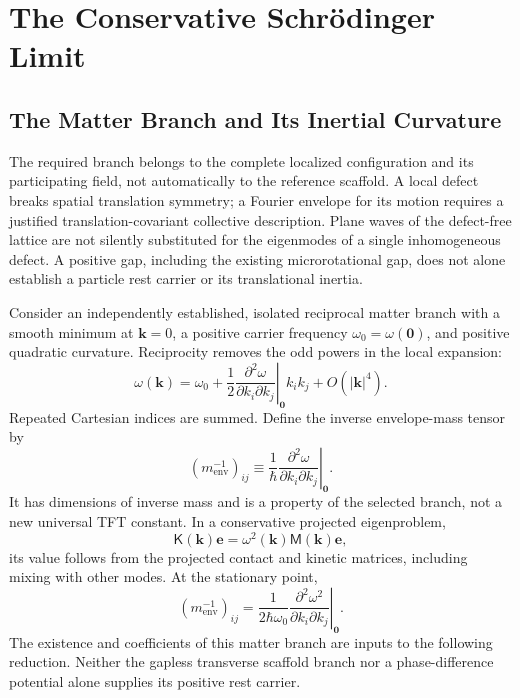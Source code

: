 \section{The Conservative Schr\"{o}dinger Limit}
\label{sec:X_schrodinger_limit}

\subsection{The Matter Branch and Its Inertial Curvature}

The required branch belongs to the complete localized configuration and its participating field, not automatically to the reference scaffold. A local defect breaks spatial translation symmetry; a Fourier envelope for its motion requires a justified translation-covariant collective description. Plane waves of the defect-free lattice are not silently substituted for the eigenmodes of a single inhomogeneous defect. A positive gap, including the existing microrotational gap, does not alone establish a particle rest carrier or its translational inertia.

Consider an independently established, isolated reciprocal matter branch with a smooth minimum at $\mathbf k=0$, a positive carrier frequency $\omega_0=\omega(\mathbf0)$, and positive quadratic curvature. Reciprocity removes the odd powers in the local expansion:
\begin{equation}
    \omega(\mathbf k)=\omega_0
    +\frac12\left.
    \frac{\partial^2\omega}{\partial k_i\partial k_j}
    \right|_{\mathbf0}k_i k_j
    +O(|\mathbf k|^4).
\end{equation}
Repeated Cartesian indices are summed. Define the inverse envelope-mass tensor by
\begin{equation}
    \left(m_{\mathrm{env}}^{-1}\right)_{ij}
    \equiv\frac{1}{\hbar}\left.
    \frac{\partial^2\omega}{\partial k_i\partial k_j}
    \right|_{\mathbf0}.
    \label{eq:X_band_mass}
\end{equation}
It has dimensions of inverse mass and is a property of the selected branch, not a new universal TFT constant. In a conservative projected eigenproblem,
\begin{equation}
    \mathsf K(\mathbf k)\mathbf e
    =\omega^2(\mathbf k)\mathsf M(\mathbf k)\mathbf e,
\end{equation}
its value follows from the projected contact and kinetic matrices, including mixing with other modes. At the stationary point,
\begin{equation}
    \left(m_{\mathrm{env}}^{-1}\right)_{ij}
    =\frac{1}{2\hbar\omega_0}\left.
    \frac{\partial^2\omega^2}{\partial k_i\partial k_j}
    \right|_{\mathbf0}.
\end{equation}
The existence and coefficients of this matter branch are inputs to the following reduction. Neither the gapless transverse scaffold branch nor a phase-difference potential alone supplies its positive rest carrier.

